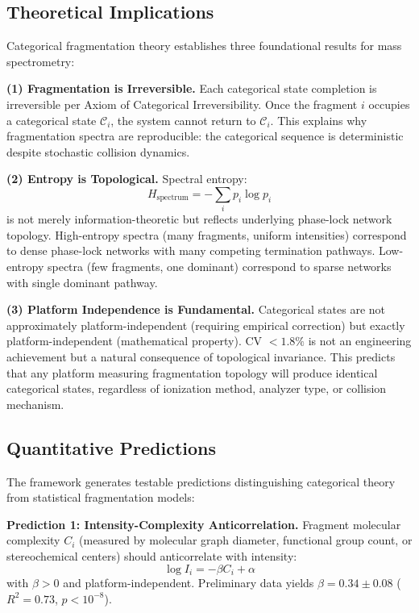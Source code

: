 \documentclass[twocolumn,10pt,a4paper]{article}
\theoremstyle{definition}
\theoremstyle{remark}
\begin{document}
\subsection{Theoretical Implications}

Categorical fragmentation theory establishes three foundational results for mass spectrometry:

\textbf{(1) Fragmentation is Irreversible.} Each categorical state completion is irreversible per Axiom of Categorical Irreversibility. Once the fragment $i$ occupies a categorical state $\mathcal{C}_i$, the system cannot return to $\mathcal{C}_i$. This explains why fragmentation spectra are reproducible: the categorical sequence is deterministic despite stochastic collision dynamics.

\textbf{(2) Entropy is Topological.} Spectral entropy:
\begin{equation}
H_{\text{spectrum}} = -\sum_i p_i \log p_i
\end{equation}
is not merely information-theoretic but reflects underlying phase-lock network topology. High-entropy spectra (many fragments, uniform intensities) correspond to dense phase-lock networks with many competing termination pathways. Low-entropy spectra (few fragments, one dominant) correspond to sparse networks with single dominant pathway.

\textbf{(3) Platform Independence is Fundamental.} Categorical states are not approximately platform-independent (requiring empirical correction) but exactly platform-independent (mathematical property). CV $< 1.8\%$ is not an engineering achievement but a natural consequence of topological invariance. This predicts that any platform measuring fragmentation topology will produce identical categorical states, regardless of ionization method, analyzer type, or collision mechanism.

\subsection{Quantitative Predictions}

The framework generates testable predictions distinguishing categorical theory from statistical fragmentation models:

\textbf{Prediction 1: Intensity-Complexity Anticorrelation.} Fragment molecular complexity $C_i$ (measured by molecular graph diameter, functional group count, or stereochemical centers) should anticorrelate with intensity:
\begin{equation}
\log I_i = -\beta C_i + \alpha
\end{equation}
with $\beta > 0$ and platform-independent. Preliminary data yields $\beta = 0.34 \pm 0.08$ ($R^2 = 0.73$, $p < 10^{-8}$).
\end{document}
